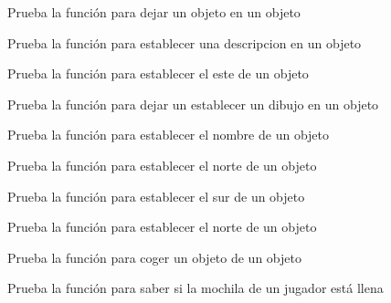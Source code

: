 \begin{DoxyRefList}
\item[\label{test__test000075}%
\Hypertarget{test__test000075}%
Member \hyperlink{object__test_8c_a934818c30bc94f423633661c38c73f2a}{test2\+\_\+object\+\_\+leave\+\_\+object} ()]Prueba la función para dejar un objeto en un objeto  
\item[\label{test__test000081}%
\Hypertarget{test__test000081}%
Member \hyperlink{object__test_8c_a65e32c3642c1d9207cdd84b134c616da}{test2\+\_\+object\+\_\+set\+\_\+description} ()]Prueba la función para establecer una descripcion en un objeto  
\item[\label{test__test000056}%
\Hypertarget{test__test000056}%
Member \hyperlink{object__test_8c_a6d5475cf455fe37de66ccca9fd2187dc}{test2\+\_\+object\+\_\+set\+\_\+east} ()]Prueba la función para establecer el este de un objeto  
\item[\label{test__test000077}%
\Hypertarget{test__test000077}%
Member \hyperlink{object__test_8c_af8a5fe8a62dfe35363d287574bac56c1}{test2\+\_\+object\+\_\+set\+\_\+gdesc} ()]Prueba la función para dejar un establecer un dibujo en un objeto  
\item[\label{test__test000049}%
\Hypertarget{test__test000049}%
Member \hyperlink{object__test_8c_acf42b7e7be91ede243f2aaa56c4c9347}{test2\+\_\+object\+\_\+set\+\_\+name} ()]Prueba la función para establecer el nombre de un objeto  
\item[\label{test__test000052}%
\Hypertarget{test__test000052}%
Member \hyperlink{object__test_8c_a9ada47d4e8c46f0f3374b2fa66d6430c}{test2\+\_\+object\+\_\+set\+\_\+north} ()]Prueba la función para establecer el norte de un objeto  
\item[\label{test__test000054}%
\Hypertarget{test__test000054}%
Member \hyperlink{object__test_8c_aa606c3fb296b209d5165b0c45a322fec}{test2\+\_\+object\+\_\+set\+\_\+south} ()]Prueba la función para establecer el sur de un objeto  
\item[\label{test__test000058}%
\Hypertarget{test__test000058}%
Member \hyperlink{object__test_8c_a79539ace87f072f2722181db52004696}{test2\+\_\+object\+\_\+set\+\_\+west} ()]Prueba la función para establecer el norte de un objeto  
\item[\label{test__test000062}%
\Hypertarget{test__test000062}%
Member \hyperlink{object__test_8c_a0bd507dfdefd8223c1c0d5c8aeb44d23}{test2\+\_\+object\+\_\+take\+\_\+object} ()]Prueba la función para coger un objeto de un objeto  
\item[\label{test__test000226}%
\Hypertarget{test__test000226}%
Member \hyperlink{player__test_8h_aac711c53eb08f5e0d6966d80ede4f7ed}{test2\+\_\+player\+\_\+bag\+\_\+is\+\_\+full} ()]Prueba la función para saber si la mochila de un jugador está llena 


\end{DoxyRefList}
